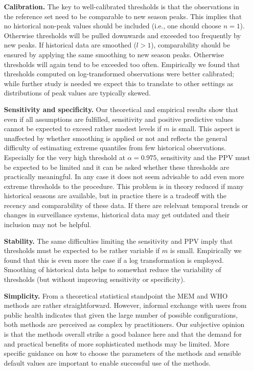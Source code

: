 \documentclass{article}
\begin{document}
\begin{description}
\item \textbf{Calibration.} The key to well-calibrated thresholds is that the observations in the reference set need to be comparable to new season peaks. This implies that no historical non-peak values should be included (i.e., one should choose $n = 1$). Otherwise thresholds will be pulled downwards and exceeded too frequently by new peaks. If historical data are smoothed ($l > 1$), comparability should be ensured by applying the same smoothing to new season peaks. Otherwise thresholds will again tend to be exceeded too often. Empirically we found that thresholds computed on log-transformed observations were better calibrated; while further study is needed we expect this to translate to other settings as distributions of peak values are typically skewed.
\item \textbf{Sensitivity and specificity.} Our theoretical and empirical results show that even if all assumptions are fulfilled, sensitivity and positive predictive values cannot be expected to exceed rather modest levels if $m$ is small. This aspect is unaffected by whether smoothing is applied or not and reflects the general difficulty of estimating extreme quantiles from few historical observations. Especially for the very high threshold at $\alpha = 0.975$, sensitivity and the PPV must be expected to be limited and it can be asked whether these thresholds are practically meaningful. In any case it does not seem advisable to add even more extreme thresholds to the procedure. This problem is in theory reduced if many historical seasons are available, but in practice there is a tradeoff with the recency and comparability of these data. If there are relelvant temporal trends or changes in surveillance systems, historical data may get outdated and their inclusion may not be helpful.
\item \textbf{Stability.} The same difficulties limiting the sensitivity and PPV imply that thresholds must be expected to be rather variable if $m$ is small. Empirically we found that this is even more the case if a log transformation is employed. Smoothing of historical data helps to somewhat reduce the variability of thresholds (but without improving sensitivity or specificity).
\item \textbf{Simplicity.} From a theoretical statistical standpoint the MEM and WHO methods are rather straightforward. However, informal exchange with users from public health indicates that given the large number of possible configurations, both methods are perceived as complex by practitioners. Our subjective opinion is that the methods overall strike a good balance here and that the demand for and practical benefits of more sophisticated methods may be limited. More specific guidance on how to choose the parameters of the methods and sensible default values are important to enable successful use of the methods.

\end{description}
\end{document}
